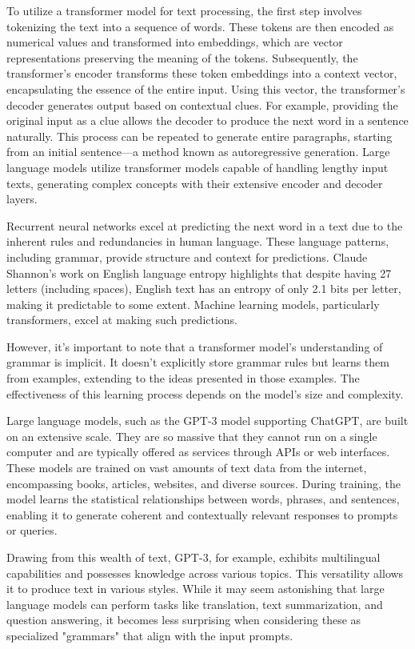 To utilize a transformer model for text processing, the first step involves tokenizing the text into a sequence of words. These tokens are then encoded as numerical values and transformed into embeddings, which are vector representations preserving the meaning of the tokens. Subsequently, the transformer's encoder transforms these token embeddings into a context vector, encapsulating the essence of the entire input. Using this vector, the transformer's decoder generates output based on contextual clues. For example, providing the original input as a clue allows the decoder to produce the next word in a sentence naturally. This process can be repeated to generate entire paragraphs, starting from an initial sentence—a method known as autoregressive generation. Large language models utilize transformer models capable of handling lengthy input texts, generating complex concepts with their extensive encoder and decoder layers.

Recurrent neural networks excel at predicting the next word in a text due to the inherent rules and redundancies in human language. These language patterns, including grammar, provide structure and context for predictions. Claude Shannon's work on English language entropy highlights that despite having 27 letters (including spaces), English text has an entropy of only 2.1 bits per letter, making it predictable to some extent. Machine learning models, particularly transformers, excel at making such predictions.

However, it's important to note that a transformer model's understanding of grammar is implicit. It doesn't explicitly store grammar rules but learns them from examples, extending to the ideas presented in those examples. The effectiveness of this learning process depends on the model's size and complexity.

Large language models, such as the GPT-3 model supporting ChatGPT, are built on an extensive scale. They are so massive that they cannot run on a single computer and are typically offered as services through APIs or web interfaces. These models are trained on vast amounts of text data from the internet, encompassing books, articles, websites, and diverse sources. During training, the model learns the statistical relationships between words, phrases, and sentences, enabling it to generate coherent and contextually relevant responses to prompts or queries.

Drawing from this wealth of text, GPT-3, for example, exhibits multilingual capabilities and possesses knowledge across various topics. This versatility allows it to produce text in various styles. While it may seem astonishing that large language models can perform tasks like translation, text summarization, and question answering, it becomes less surprising when considering these as specialized "grammars" that align with the input prompts.

